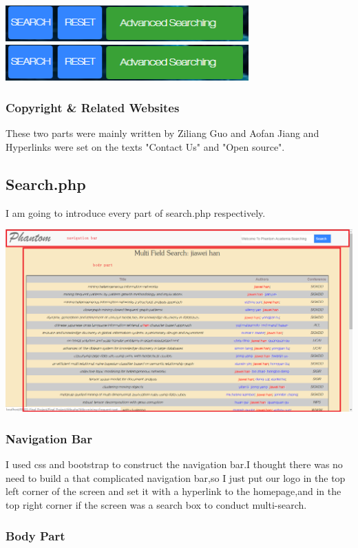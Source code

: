 \documentclass[10pt,twoside,a4paper,titlepage]{article}
\begin{document}
	\newline	
	\includegraphics[width=0.7\textwidth]{cyf/Advanced_searching30.png}
	\newline	
	\includegraphics[width=0.7\textwidth]{cyf/Advanced_searching31.png}
	
	\subsubsection{Copyright \& Related Websites}
	
	These two parts were mainly written by Ziliang Guo and Aofan Jiang and Hyperlinks were set on the texts "Contact Us" and "Open source".
	
	\subsection{Search.php}
	
	I am going to introduce every part of search.php respectively.
	\newline
	
	\includegraphics[width=1.0\textwidth]{cyf/SEARCH_struct1.png}
	
	\subsubsection{Navigation Bar}
	
	I used css and bootstrap to construct the navigation bar.I thought there was no need to build a  that complicated navigation bar,so I just put our logo in the top left corner of the screen and set it with a hyperlink to the homepage,and in the top right corner if the screen was a search box to conduct multi-search.
	
	\subsubsection{Body Part}
	
	
	
	
	
	
		
	
	 
	
	
	
\end{document}
